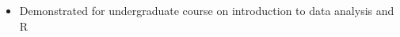 \documentclass[letterpaper,11pt]{article}
\makeatletter
\newcommand{\resitem}[1]{\item #1 \vspace{-2pt}}
\newcommand{\ressubheading}[4]{
  \begin{tabular*}{6.5in}{l@{\extracolsep{\fill}}r}
    \textbf{#1} & #2 \\
    \textit{#3} & \textit{#4} \\
\end{tabular*}\vspace{-6pt}}
\makeatother
\begin{document}
\begin{itemize}
{\begin{itemize}
            \resitem{Demonstrated for undergraduate course on introduction to data analysis and R }
				\end{itemize}
				}
\end{itemize}  %
\end{document}
